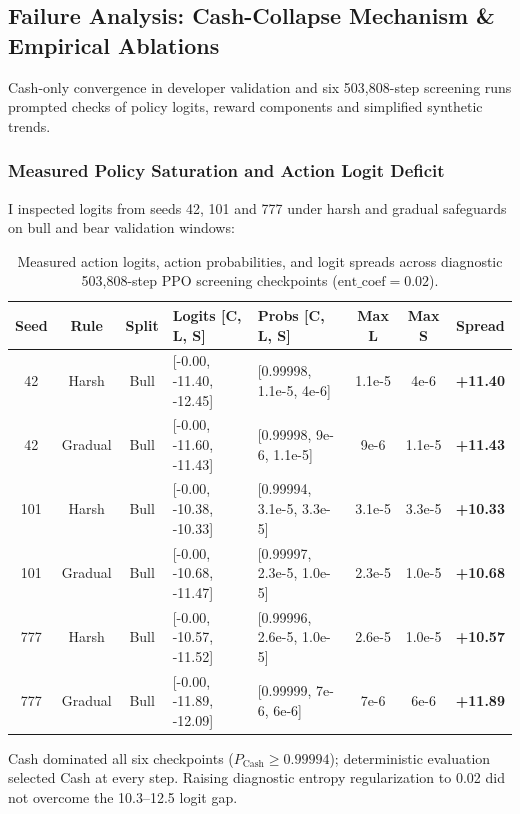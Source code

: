 \documentclass[11pt,a4paper]{article}
\begin{document}
\subsection{Failure Analysis: Cash-Collapse Mechanism \& Empirical Ablations}
\label{sec:cash_collapse}
\label{sec:cash_collapse_forensics}
Cash-only convergence in developer validation and six 503,808-step screening runs prompted checks of policy logits, reward components and simplified synthetic trends.

\subsubsection{Measured Policy Saturation and Action Logit Deficit}
I inspected logits from seeds 42, 101 and 777 under harsh and gradual safeguards on bull and bear validation windows:

\begin{table}[H]
\centering
\footnotesize
\begin{tabularx}{\textwidth}{c c c p{2.7cm} p{2.7cm} c c c}
\toprule
\textbf{Seed} & \textbf{Rule} & \textbf{Split} & \textbf{Logits [C, L, S]} & \textbf{Probs [C, L, S]} & \textbf{Max L} & \textbf{Max S} & \textbf{Spread} \\
\midrule
42 & Harsh & Bull & [-0.00, -11.40, -12.45] & [0.99998, 1.1e-5, 4e-6] & 1.1e-5 & 4e-6 & \textbf{+11.40} \\
42 & Gradual & Bull & [-0.00, -11.60, -11.43] & [0.99998, 9e-6, 1.1e-5] & 9e-6 & 1.1e-5 & \textbf{+11.43} \\
101 & Harsh & Bull & [-0.00, -10.38, -10.33] & [0.99994, 3.1e-5, 3.3e-5] & 3.1e-5 & 3.3e-5 & \textbf{+10.33} \\
101 & Gradual & Bull & [-0.00, -10.68, -11.47] & [0.99997, 2.3e-5, 1.0e-5] & 2.3e-5 & 1.0e-5 & \textbf{+10.68} \\
777 & Harsh & Bull & [-0.00, -10.57, -11.52] & [0.99996, 2.6e-5, 1.0e-5] & 2.6e-5 & 1.0e-5 & \textbf{+10.57} \\
777 & Gradual & Bull & [-0.00, -11.89, -12.09] & [0.99999, 7e-6, 6e-6] & 7e-6 & 6e-6 & \textbf{+11.89} \\
\bottomrule
\end{tabularx}
\caption{Measured action logits, action probabilities, and logit spreads across diagnostic 503,808-step PPO screening checkpoints ($\text{ent\_coef}=0.02$).}
\label{tab:checkpoint_logits}
\end{table}

Cash dominated all six checkpoints ($P_{\text{Cash}} \ge 0.99994$); deterministic evaluation selected Cash at every step. Raising diagnostic entropy regularization to 0.02 did not overcome the 10.3--12.5 logit gap.
\end{document}
